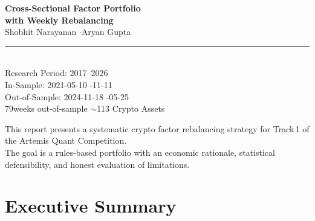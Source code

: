 \documentclass[11pt,a4paper]{article}
\begin{document}
\begin{titlepage}
\vspace{4cm}
\begin{center}
  {\LARGE\bfseries\color{beigetitle} Cross-Sectional Factor Portfolio\\[8pt] with Weekly Rebalancing}\\[24pt]
  {\large\color{beigeaccent} Shobhit Narayanan \quad$\cdot$\quad Aryan Gupta}\\[36pt]
  {\color{rulecolor}\rule{0.4\textwidth}{0.6pt}}\\[12pt]
  {\small\color{beigeaccent} Research Period: 2017--2026\\[3pt]
  In-Sample: 2021-05-10 \;\textendash{}-11-11\\[3pt]
  Out-of-Sample: 2024-11-18 \;\textendash{}-05-25\\[3pt]
  79\;weeks out-of-sample \;\textendash\; $\sim$113 Crypto Assets}
\end{center}
\vfill
\begin{center}
  {\footnotesize\color{beigeaccent} This report presents a systematic crypto factor rebalancing strategy for Track\,1 of the Artemis Quant Competition.\\[2pt]
  The goal is a rules-based portfolio with an economic rationale, statistical defensibility, and honest evaluation of limitations.}
\end{center}
\end{titlepage}

\newpage
\setcounter{page}{2}
\tableofcontents
\newpage

\section{Executive Summary}
\end{document}
